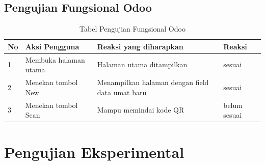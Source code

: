 \subsection{Pengujian Fungsional Odoo}
\label{sec:pengujianFungsionalOdoo}

\begin{table}[H]
	\centering
	\caption{Tabel Pengujian Fungsional Odoo}
	\begin{tabular}{|p{0.5cm}| p{5cm}| p{6cm}| p{2.5cm}|} \hline
		No	&	Aksi Pengguna	&	Reaksi yang diharapkan	&	Reaksi \\ \hline
		1 	&  Membuka halaman utama & Halaman utama ditampilkan &	sesuai	\\ \hline
		2 	&  Menekan tombol New & Menampilkan halaman dengan field data umat baru &	sesuai	\\ \hline
		3 	&  Menekan tombol Scan & Mampu memindai kode QR  &	belum sesuai	\\ \hline
	\end{tabular}
	\label{table:fungsionalOdoo}
\end{table}

\section{Pengujian Eksperimental}
\label{sec:pengujianEksperimental}







